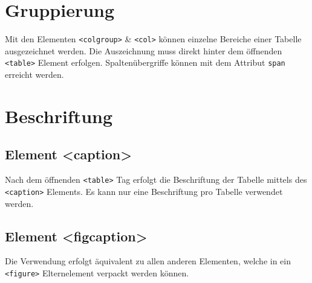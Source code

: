 \section{Gruppierung}
Mit den Elementen \texttt{<colgroup>} \& \texttt{<col>} können einzelne Bereiche einer Tabelle ausgezeichnet werden. Die Auszeichnung muss direkt hinter dem öffnenden \texttt{<table>} Element erfolgen. Spaltenübergriffe können mit dem Attribut \texttt{span} erreicht werden.
\section{Beschriftung}
\subsection{Element <caption>}
Nach dem öffnenden \texttt{<table>} Tag erfolgt die Beschriftung der Tabelle mittels des \texttt{<caption>} Elements. Es kann nur eine Beschriftung pro Tabelle verwendet werden.
\subsection{Element <figcaption>}
Die Verwendung erfolgt äquivalent zu allen anderen Elementen, welche in ein \texttt{<figure>} Elternelement verpackt werden können.
